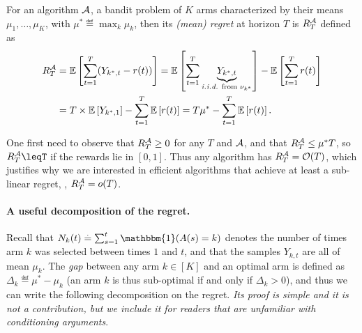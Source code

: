 \begin{definition}[Regret]\label{def:2:regret}
\begin{leftbar}[defnbar]  %
    For an algorithm $\mathcal{A}$, a bandit problem of $K$ arms characterized by their means $\mu_1,\dots,\mu_K$, with $\mu^* \eqdef \max_k \mu_k$, then its \emph{(mean) regret} at horizon $T$ is $R_T^{\mathcal{A}}$ defined as
    \begin{align}\label{eq:2:regret}
        R_T^{\mathcal{A}}
        & = \mathbb{E}\left[ \sum_{t=1}^T (Y_{k^*,t} - r(t)) \right]
        = \mathbb{E}\left[ \sum_{t=1}^T \underbrace{Y_{k^*,t}}_{\text{\emph{i.i.d.}{} from $\nu_{k^*}$}} \right] - \mathbb{E}\left[ \sum_{t=1}^T r(t) \right] \\
        & = T \times \mathbb{E}\left[ Y_{k^*,1} \right] - \sum_{t=1}^T \mathbb{E}\left[ r(t) \right]
        = T \mu^* - \sum_{t=1}^T \mathbb{E}\left[ r(t) \right].
    \end{align}
\end{leftbar}  %
\end{definition}

One first need to observe that $R_T^{\mathcal{A}} \geq 0$ for any $T$ and $\mathcal{A}$, and that $R_T^{\mathcal{A}} \leq \mu^* T$, so $R_T^{\cA} \leqT$ if the rewards lie in $[0,1]$.
Thus any algorithm has $R_T^{\mathcal{A}} = \mathop{}\mathopen{}\mathcal{O}\mathopen{}\left(T\right)$, which justifies why we are interested in efficient algorithms that achieve at least a sub-linear regret, \ie, $R_T^{\mathcal{A}} = \mathop{}\mathopen{}o\mathopen{}\left(T\right)$.

\paragraph{A useful decomposition of the regret.}
%
Recall that $N_k(t) \eqdef \sum_{s=1}^t \mathbbm{1}(A(s) = k)$ denotes the number of times arm $k$ was selected between times $1$ and $t$,
%
and that the samples $Y_{k,t}$ are all \iid{} of mean $\mu_k$.
The \emph{gap} between any arm $k\in[K]$ and an optimal arm is defined as $\Delta_k \eqdef \mu^* - \mu_k$
(an arm $k$ is thus sub-optimal if and only if $\Delta_k > 0$),
and thus we can write the following decomposition on the regret.
%
\emph{Its proof is simple and it is not a contribution, but we include it for readers that are unfamiliar with conditioning arguments}.

